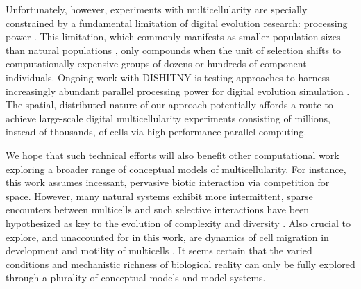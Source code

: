 Unfortunately, however, experiments with multicellularity are specially constrained by a fundamental limitation of digital evolution research: processing power \citep{Moreno_2020}.
This limitation, which commonly manifests as smaller population sizes than natural populations \citep{liard2018complexity}, only compounds when the unit of selection shifts to computationally expensive groups of dozens or hundreds of component individuals.
Ongoing work with DISHITNY is testing approaches to harness increasingly abundant parallel processing power for digital evolution simulation \citep{moreno2021conduit}.
The spatial, distributed nature of our approach potentially affords a route to achieve large-scale digital multicellularity experiments consisting of millions, instead of thousands, of cells via high-performance parallel computing.

We hope that such technical efforts will also benefit other computational work exploring a broader range of conceptual models of multicellularity.
For instance, this work assumes incessant, pervasive biotic interaction via competition for space.
However, many natural systems exhibit more intermittent, sparse encounters between multicells and such selective interactions have been hypothesized as key to the evolution of complexity and diversity \citep{soros2014identifying}.
Also crucial to explore, and unaccounted for in this work, are dynamics of cell migration in development \citep{horwitz2003cell} and motility of multicells \citep{arnellos2019bodily}.
It seems certain that the varied conditions and mechanistic richness of biological reality can only be fully explored through a plurality of conceptual models and model systems.
